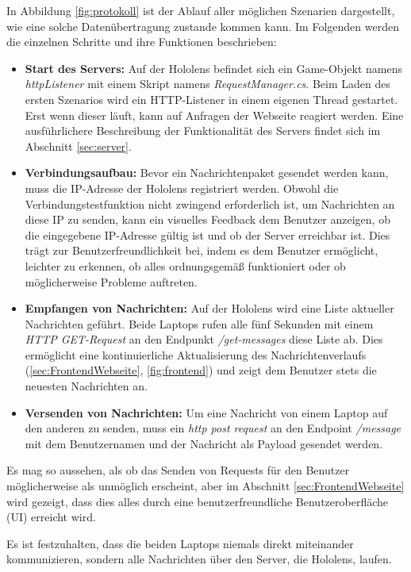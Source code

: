 \begin{itemize}
In Abbildung \ref{fig:protokoll} ist der Ablauf aller möglichen Szenarien dargestellt, wie eine solche Datenübertragung zustande kommen kann. Im Folgenden werden die einzelnen Schritte und ihre Funktionen beschrieben:

\begin{itemize}
    \item \textbf{Start des Servers:} Auf der Hololens befindet sich ein Game-Objekt namens \textit{httpListener} mit einem Skript namens \textit{RequestManager.cs}. Beim Laden des ersten Szenarios wird ein HTTP-Listener in einem eigenen Thread gestartet. Erst wenn dieser läuft, kann auf Anfragen der Webseite reagiert werden. Eine ausführlichere Beschreibung der Funktionalität des Servers findet sich im Abschnitt \ref{sec:server}.
    \item \textbf{Verbindungsaufbau:} Bevor ein Nachrichtenpaket gesendet werden kann, muss die IP-Adresse der Hololens registriert werden. Obwohl die Verbindungstestfunktion nicht zwingend erforderlich ist, um Nachrichten an diese IP zu senden, kann ein visuelles Feedback dem Benutzer anzeigen, ob die eingegebene IP-Adresse gültig ist und ob der Server erreichbar ist. Dies trägt zur Benutzerfreundlichkeit bei, indem es dem Benutzer ermöglicht, leichter zu erkennen, ob alles ordnungsgemäß funktioniert oder ob möglicherweise Probleme auftreten.
    \item \textbf{Empfangen von Nachrichten:} Auf der Hololens wird eine Liste aktueller Nachrichten geführt. Beide Laptops rufen alle fünf Sekunden mit einem \textit{HTTP GET-Request} an den Endpunkt \textit{/get-messages} diese Liste ab. Dies ermöglicht eine kontinuierliche Aktualisierung des Nachrichtenverlaufs (\ref{sec:FrontendWebseite}, \ref{fig:frontend}) und zeigt dem Benutzer stets die neuesten Nachrichten an.
    \item \textbf{Versenden von Nachrichten:} Um eine Nachricht von einem Laptop auf den anderen zu senden, muss ein \textit{http post request} an den Endpoint \textit{/message} mit dem Benutzernamen und der Nachricht als Payload gesendet werden.
\end{itemize}

Es mag so aussehen, als ob das Senden von Requests für den Benutzer möglicherweise als unmöglich erscheint, aber im Abschnitt \ref{sec:FrontendWebseite} wird gezeigt, dass dies alles durch eine benutzerfreundliche Benutzeroberfläche (UI) erreicht wird.

Es ist festzuhalten, dass die beiden Laptops niemals direkt miteinander kommunizieren, sondern alle Nachrichten über den Server, die Hololens, laufen.


\end{itemize}
